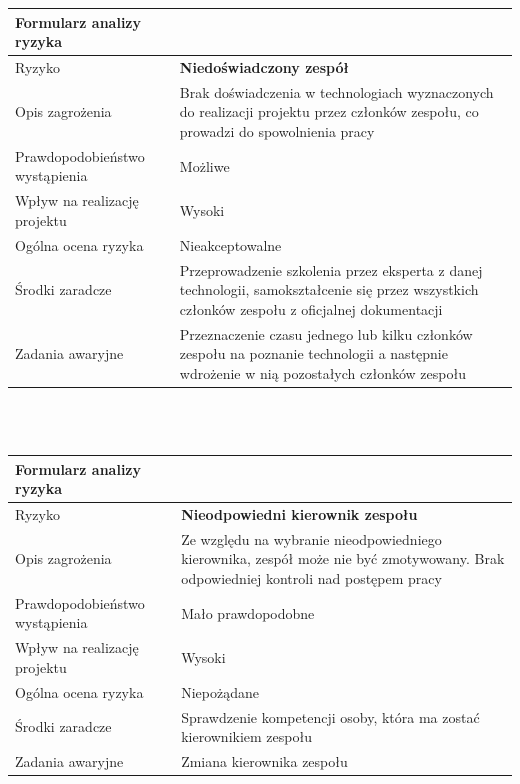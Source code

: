 \documentclass{article}
\begin{document}
{\def\arraystretch{1.3}\tabcolsep=10pt
\begin{tabular}{|L{6cm}|L{9cm}|}
\hline
Formularz analizy ryzyka &  \\
\hline
Ryzyko 						   & \textbf{Niedoświadczony zespół} \\
\hline
Opis zagrożenia				   & Brak doświadczenia w technologiach wyznaczonych do realizacji projektu przez członków zespołu, co prowadzi do spowolnienia pracy \\
\hline
Prawdopodobieństwo wystąpienia & Możliwe \\
\hline
Wpływ na realizację projektu   & Wysoki \\
\hline
Ogólna ocena ryzyka   & Nieakceptowalne \\
\hline
Środki zaradcze				   & Przeprowadzenie szkolenia przez eksperta z danej technologii, samokształcenie się przez wszystkich członków zespołu z oficjalnej dokumentacji  \\
\hline
Zadania awaryjne			   & Przeznaczenie czasu jednego lub kilku członków zespołu na poznanie technologii a następnie wdrożenie w nią pozostałych członków zespołu \\
\hline
\end{tabular}}

\mbox{}\\\mbox{}\\

{\def\arraystretch{1.3}\tabcolsep=10pt
\begin{tabular}{|L{6cm}|L{9cm}|}
\hline
Formularz analizy ryzyka &  \\
\hline
Ryzyko 						   & \textbf{Nieodpowiedni kierownik zespołu} \\
\hline
Opis zagrożenia				   & Ze względu na wybranie nieodpowiedniego kierownika, zespół może nie być zmotywowany. Brak odpowiedniej kontroli nad postępem pracy \\
\hline
Prawdopodobieństwo wystąpienia & Mało prawdopodobne \\
\hline
Wpływ na realizację projektu   & Wysoki \\
\hline
Ogólna ocena ryzyka   & Niepożądane \\
\hline
Środki zaradcze				   & Sprawdzenie kompetencji osoby, która ma zostać kierownikiem zespołu \\
\hline
Zadania awaryjne			   & Zmiana kierownika zespołu \\
\hline
\end{tabular}}

\mbox{}\\\mbox{}\\
\end{document}
